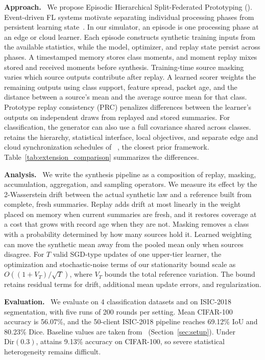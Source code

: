\noindent\textbf{Approach.}~
We propose Episodic Hierarchical Split-Federated Prototyping (\ehsfp{}). Event-driven FL systems motivate separating individual processing phases from persistent learning state~\cite{grafberger2021fedless,qi2024lifl}. In our simulator, an episode is one processing phase at an edge or cloud learner. Each episode constructs synthetic training inputs from the available statistics, while the model, optimizer, and replay state persist across phases. A timestamped memory stores class moments, and moment replay mixes stored and received moments before synthesis. Training-time source masking varies which source outputs contribute after replay. A learned scorer weights the remaining outputs using class support, feature spread, packet age, and the distance between a source's mean and the average source mean for that class. Prototype replay consistency (PRC) penalizes differences between the learner's outputs on independent draws from replayed and stored summaries. For classification, the generator can also use a full covariance shared across classes. \ehsfp{} retains the hierarchy, statistical interface, local objectives, and separate edge and cloud synchronization schedules of \hsfp{}~\cite{tran2026h}, the closest prior framework. Table~\ref{tab:extension_comparison} summarizes the differences.

\noindent\textbf{Analysis.}~
We write the synthesis pipeline as a composition of replay, masking, accumulation, aggregation, and sampling operators. We measure its effect by the 2-Wasserstein drift between the actual synthetic law and a reference built from complete, fresh summaries. Replay adds drift at most linearly in the weight placed on memory when current summaries are fresh, and it restores coverage at a cost that grows with record age when they are not. Masking removes a class with a probability determined by how many sources hold it. Learned weighting can move the synthetic mean away from the pooled mean only when sources disagree. For $T$ valid SGD-type updates of one upper-tier learner, the optimization and stochastic-noise terms of our stationarity bound scale as $O((1+V_T)/\sqrt{T})$, where $V_T$ bounds the total reference variation. The bound retains residual terms for drift, additional mean update errors, and regularization.

\noindent\textbf{Evaluation.}~
We evaluate \ehsfp{} on 4 classification datasets and on ISIC-2018 segmentation, with five runs of 200 rounds per setting. Mean CIFAR-100 accuracy is 56.07\%, and the 50-client ISIC-2018 pipeline reaches 69.12\% IoU and 80.23\% Dice. Baseline values are taken from~\cite{tran2026h} (Section~\ref{sec:setup}). Under $\mathrm{Dir}(0.3)$, \ehsfp{} attains 9.13\% accuracy on CIFAR-100, so severe statistical heterogeneity remains difficult.

